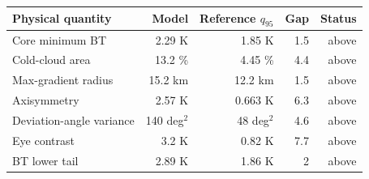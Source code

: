 \begin{tabular}{lrrrr}
\hline
Physical quantity & Model & Reference $q_{95}$ & Gap & Status \\
\hline
Core minimum BT & 2.29 K & 1.85 K & 1.5 & above \\
Cold-cloud area & 13.2 \% & 4.45 \% & 4.4 & above \\
Max-gradient radius & 15.2 km & 12.2 km & 1.5 & above \\
Axisymmetry & 2.57 K & 0.663 K & 6.3 & above \\
Deviation-angle variance & 140 deg$^2$ & 48 deg$^2$ & 4.6 & above \\
Eye contrast & 3.2 K & 0.82 K & 7.7 & above \\
BT lower tail & 2.89 K & 1.86 K & 2 & above \\
\hline
\end{tabular}
